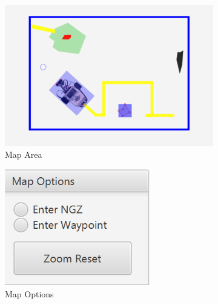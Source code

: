 \begin{figure}[H]
	\centering
	\begin{subfigure}[t]{0.4\textwidth}
		\includegraphics[width=0.95\linewidth]{MapArea.png}  
		\caption{Map Area}
		\label{fig:Map Area}                
	\end{subfigure}
	\begin{subfigure}[t]{0.25\textwidth}
		\includegraphics[width=0.95\linewidth]{MapOptions.png}  
		\caption{Map Options}
		\label{fig:Map Options}                
	\end{subfigure}
	\begin{subfigure}[t]{0.25\textwidth}

\end{subfigure}
\end{figure}
